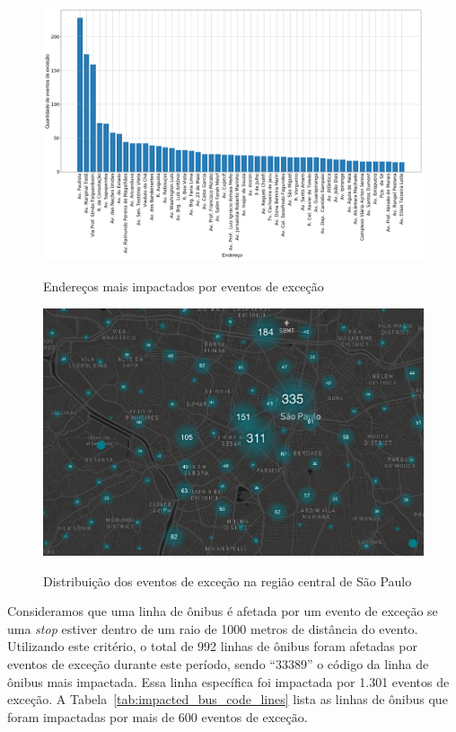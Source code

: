 \documentclass[
	12pt,				%
	oneside,			%
	a4paper,			%
	english,			%
	brazil				%
	]{abntex2ppgsi}
\begin{document}
{{\begin{figure}[!htb]
	\centering
 	  \caption{Endereços mais impactados por eventos de exceção}
		\includegraphics[width=1\linewidth]{images/address_analysis_pt.png}
	\label{fig:address_analysis}
\end{figure}

\begin{figure}[!htb]
	\centering
 	  \caption{Distribuição dos eventos de exceção na região central de São Paulo}
		\includegraphics[width=1\linewidth]{images/exception_events_sp.png}
	\label{fig:dispersion}
\end{figure}

Consideramos que uma linha de ônibus é afetada por um evento de exceção se uma \textit{stop} estiver dentro de um raio de 1000 metros de distância do evento. Utilizando este critério, o total de 992 linhas de ônibus foram afetadas por eventos de exceção durante este período, sendo ``33389'' o código da linha de ônibus mais impactada. Essa linha específica foi impactada por 1.301 eventos de exceção. A Tabela~\ref{tab:impacted_bus_code_lines} lista as linhas de ônibus que foram impactadas por mais de 600 eventos de exceção.

}}
\end{document}

